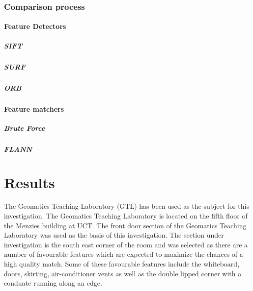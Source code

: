 \documentclass[11pt,a4paper]{report}
\begin{document}
		\subsection{Comparison process}
			\subsubsection{Feature Detectors}
				\paragraph{SIFT}
				\paragraph{SURF}
				\paragraph{ORB}
			\subsubsection{Feature matchers}
				\paragraph{Brute Force}
				\paragraph{FLANN}

\chapter{Results}
	The Geomatics Teaching Laboratory (GTL) has been used as the subject for this investigation. The Geomatics Teaching Laboratory is located on the fifth floor of the Menzies building at UCT. The front door section of the Geomatics Teaching Laboratory was used as the basis of this investigation. The section under investigation is the south east corner of the room and was selected as there are a number of favourable features which are expected to maximize the chances of a high quality match. Some of these favourable features include the whiteboard, doors, skirting, air-conditioner vents as well as the double lipped corner with a conduate running along an edge.
	
	
\end{document}

